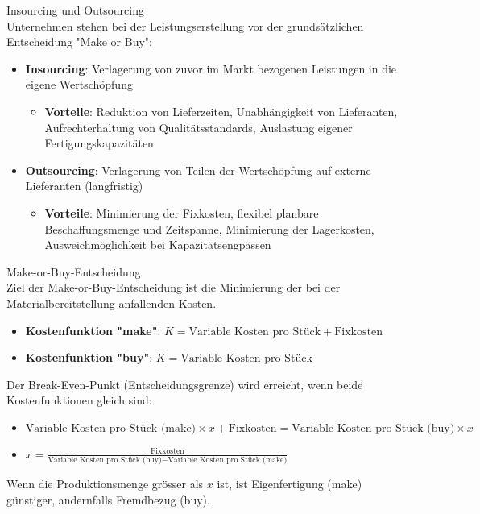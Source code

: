 \begin{definition}{Insourcing und Outsourcing}\\
Unternehmen stehen bei der Leistungserstellung vor der grundsätzlichen Entscheidung "Make or Buy":
\begin{itemize}
    \item \textbf{Insourcing}: Verlagerung von zuvor im Markt bezogenen Leistungen in die eigene Wertschöpfung
    \begin{itemize}
        \item \textbf{Vorteile}: Reduktion von Lieferzeiten, Unabhängigkeit von Lieferanten, Aufrechterhaltung von Qualitätsstandards, Auslastung eigener Fertigungskapazitäten
    \end{itemize}
    \item \textbf{Outsourcing}: Verlagerung von Teilen der Wertschöpfung auf externe Lieferanten (langfristig)
    \begin{itemize}
        \item \textbf{Vorteile}: Minimierung der Fixkosten, flexibel planbare Beschaffungsmenge und Zeitspanne, Minimierung der Lagerkosten, Ausweichmöglichkeit bei Kapazitätsengpässen
    \end{itemize}
\end{itemize}
\end{definition}

\begin{concept}{Make-or-Buy-Entscheidung}\\
Ziel der Make-or-Buy-Entscheidung ist die Minimierung der bei der Materialbereitstellung anfallenden Kosten.
\begin{itemize}
    \item \textbf{Kostenfunktion "make"}: $K = \text{Variable Kosten pro Stück} + \text{Fixkosten}$
    \item \textbf{Kostenfunktion "buy"}: $K = \text{Variable Kosten pro Stück}$
\end{itemize}

Der Break-Even-Punkt (Entscheidungsgrenze) wird erreicht, wenn beide Kostenfunktionen gleich sind:
\begin{itemize}
    \item $\text{Variable Kosten pro Stück (make)} \times x + \text{Fixkosten} = \text{Variable Kosten pro Stück (buy)} \times x$
    \item $x = \frac{\text{Fixkosten}}{\text{Variable Kosten pro Stück (buy)} - \text{Variable Kosten pro Stück (make)}}$
\end{itemize}

Wenn die Produktionsmenge grösser als $x$ ist, ist Eigenfertigung (make) günstiger, andernfalls Fremdbezug (buy).
\end{concept}

